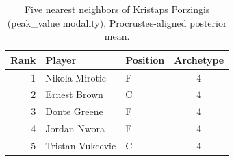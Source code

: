 \begin{table}[htbp]
  \centering\small
  \begin{tabular}{rllc}
    \toprule
    Rank & Player & Position & Archetype \\
    \midrule
    1 & Nikola Mirotic & F & 4 \\
    2 & Ernest Brown & C & 4 \\
    3 & Donte Greene & F & 4 \\
    4 & Jordan Nwora & F & 4 \\
    5 & Tristan Vukcevic & C & 4 \\
    \bottomrule
  \end{tabular}
  \caption{Five nearest neighbors of Kristaps Porzingis (peak_value modality), Procrustes-aligned posterior mean.}
  \label{tab:Kristaps_Porzingis_neighbors_peak_value}
\end{table}

